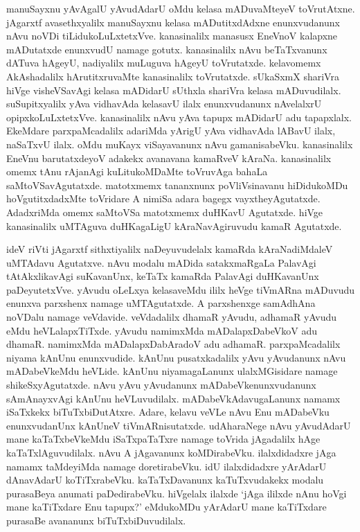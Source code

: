 manuSayxnu yAvAgalU yAvudAdarU oMdu kelasa mADuvaMteyeV toVrutAtxne. jAgarxtf avasethxyalilx manuSayxnu kelasa mADutitxdAdxne enunxvudanunx nAvu noVDi tiLidukoLuLxtetxVve. kanasinalilx manasusx EneVnoV kalapxne mADutatxde enunxvudU namage gotutx. kanasinalilx nAvu beTaTxvanunx dATuva hAgeyU, nadiyalilx muLuguva hAgeyU toVrutatxde. kelavomemx AkAshadalilx hArutitxruvaMte kanasinalilx toVrutatxde. sUkaSxmX shariVra hiVge visheVSavAgi kelasa mADidarU sUthxla shariVra kelasa mADuvudilalx. suSupitxyalilx yAva vidhavAda kelasavU ilalx enunxvudanunx nAvelalxrU opipxkoLuLxtetxVve. kanasinalilx nAvu yAva tapupx mADidarU adu tapapxlalx. EkeMdare parxpaMcadalilx adariMda yArigU yAva vidhavAda lABavU ilalx, naSaTxvU ilalx. oMdu muKayx viSayavanunx nAvu gamanisabeVku. kanasinalilx EneVnu barutatxdeyoV adakekx avanavana kamaRveV kAraNa. kanasinalilx omemx tAnu rAjanAgi kuLitukoMDaMte toVruvAga bahaLa saMtoVSavAgutatxde. matotxmemx tananxnunx poVliVsinavanu hiDidukoMDu hoVgutitxdadxMte toVridare A nimiSa adara bagegx vayxtheyAgutatxde. AdadxriMda omemx saMtoVSa matotxmemx duHKavU Agutatxde. hiVge kanasinalilx uMTAguva duHKagaLigU kAraNavAgiruvudu kamaR Agutatxde.

ideV riVti jAgarxtf sithxtiyalilx naDeyuvudelalx kamaRda kAraNadiMdaleV uMTAdavu Agutatxve. nAvu modalu mADida satakxmaRgaLa PalavAgi tAtAkxlikavAgi suKavanUnx, keTaTx kamaRda PalavAgi duHKavanUnx paDeyutetxVve. yAvudu oLeLxya kelasaveMdu ililx heVge tiVmARna mADuvudu enunxva parxshenx namage uMTAgutatxde. A parxshenxge samAdhAna noVDalu namage veVdavide. veVdadalilx dhamaR yAvudu, adhamaR yAvudu eMdu heVLalapxTiTxde. yAvudu namimxMda mADalapxDabeVkoV adu dhamaR. namimxMda mADalapxDabAradoV adu adhamaR. parxpaMcadalilx niyama kAnUnu enunxvudide. kAnUnu pusatxkadalilx yAvu yAvudanunx nAvu mADabeVkeMdu heVLide. kAnUnu niyamagaLanunx ulalxMGisidare namage shikeSxyAgutatxde. nAvu yAvu yAvudanunx mADabeVkenunxvudanunx sAmAnayxvAgi kAnUnu heVLuvudilalx. mADabeVkAdavugaLanunx namamx iSaTxkekx biTuTxbiDutAtxre. Adare, kelavu veVLe nAvu Enu mADabeVku enunxvudanUnx kAnUneV tiVmARnisutatxde. udAharaNege nAvu yAvudAdarU mane kaTaTxbeVkeMdu iSaTxpaTaTxre namage toVrida jAgadalilx hAge kaTaTxlAguvudilalx. nAvu A jAgavanunx koMDirabeVku. ilalxdidadxre jAga namamx taMdeyiMda namage doretirabeVku. idU ilalxdidadxre yArAdarU dAnavAdarU koTiTxrabeVku. kaTaTxDavanunx kaTuTxvudakekx modalu purasaBeya anumati paDedirabeVku. hiVgelalx ilalxde `jAga ililxde nAnu hoVgi mane kaTiTxdare Enu tapupx?' eMdukoMDu yArAdarU mane kaTiTxdare purasaBe avananunx biTuTxbiDuvudilalx.

